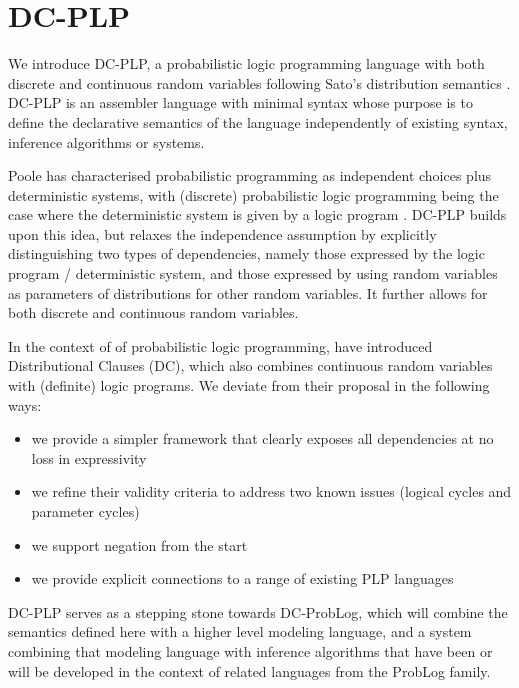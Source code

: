 \section{DC-PLP}\label{sec:semantics}
We introduce DC-PLP, a probabilistic logic programming language with both discrete and continuous random variables following Sato's distribution semantics \citep{sato1995statistical}. DC-PLP is an assembler language with minimal syntax whose  purpose is to define the declarative semantics of the language independently of existing syntax, inference algorithms or systems. 

Poole has characterised probabilistic programming as independent choices plus deterministic systems, with (discrete) probabilistic logic programming being the case where the deterministic system is given by a logic program \cite{poole2010probabilistic}. DC-PLP builds upon this idea, but relaxes the independence assumption by explicitly distinguishing two types of dependencies, namely those expressed by the logic program /  deterministic system, and those expressed by using random variables as parameters of distributions for other random variables. It further allows for both discrete and continuous random variables.

In the context of of probabilistic logic programming, \cite{gutmann2011magic} have introduced Distributional Clauses (DC), which also combines continuous random variables with (definite) logic programs. We deviate from their proposal in the following ways:
\begin{itemize}
    \item we provide a simpler framework that clearly exposes all dependencies at no loss in expressivity
    \item we refine their validity criteria to address two known issues (logical cycles and parameter cycles)
    \item we support negation from the start
    \item we provide explicit connections to a range of existing PLP languages
\end{itemize}

DC-PLP serves as a stepping stone towards DC-ProbLog, which will combine the semantics defined here with a higher level modeling language, and a system combining that modeling language with inference algorithms that have been or will be developed in the context of related languages from the ProbLog family.  

